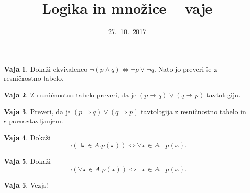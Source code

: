 \documentclass{article}
\newcommand{\lthen}{\Rightarrow}
\theoremstyle{definition}
\newtheorem{vaja}{Vaja}
\begin{document}
\title{Logika in množice -- vaje}
\date{27.~10.~2017}
\maketitle

\begin{vaja}
  Dokaži ekvivalenco $\lnot (p \land q) \iff \lnot p \lor \lnot q$.
  Nato jo preveri še z resničnostno tabelo.
\end{vaja}

\begin{vaja}
  Z resničnostno tabelo preveri, da je $(p \lthen q) \lor (q \lthen p)$ tavtologija.
\end{vaja}

\begin{vaja}
  Preveri, da je $(p \lthen q) \lor (q \lthen p)$ tavtologija z resničnostno tabelo in s
  poenostavljanjem.
\end{vaja}

\begin{vaja}
  Dokaži
  \[
    \lnot (\exists x \in A . p(x))
    \iff
    \forall x \in A . \lnot p(x).
  \]
\end{vaja}

\begin{vaja}
  Dokaži
  \[
    \lnot (\forall x \in A . p(x))
    \iff
    \exists x \in A . \lnot p(x).
  \]  
\end{vaja}

\begin{vaja}
  Vezja!
\end{vaja}
\end{document}
